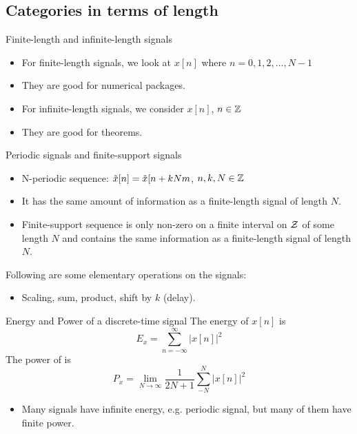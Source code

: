 \documentclass[../main.tex]{subfiles}
\begin{document}
\subsection{Categories in terms of length}
Finite-length and infinite-length signals
\begin{itemize}
    \item For finite-length signals, we look at $x[n]$ where $n=0,1,2,\dots, N-1$
    \item They are good for numerical packages.
    \item For infinite-length signals, we consider $x[n]$, $n\in \mathbb{Z}$
    \item They are good for theorems.
\end{itemize}
Periodic signals and finite-support signals
\begin{itemize}
    \item N-periodic sequence: $\Tilde{x}[n]=\Tilde{x}[n+kNm$, $n,k,N\in \mathbb{Z}$
    \item It has the same amount of information as a finite-length signal of length $N$.
    \item Finite-support sequence is only non-zero on a finite interval on $\mathcal{Z}$ of some length $N$ and contains the same information as a finite-length signal of length $N$.
\end{itemize}
Following are some elementary operations on the signals:\begin{itemize}
    \item Scaling, sum, product, shift by $k$ (delay).
\end{itemize}
\begin{gbox}{Energy and Power of a discrete-time signal}
    The energy of $x[n]$ is \[
    E_x = \sum_{n=-\infty}^\infty |x[n]|^2
    \]
    The power of is \[
    P_x = \lim_{N\to \infty} \frac{1}{2N+1}\sum_{-N}^N |x[n]|^2
    \]
    \begin{itemize}
        \item Many signals have infinite energy, e.g. periodic signal, but many of them have finite power.
    \end{itemize}
\end{gbox}
\end{document}
